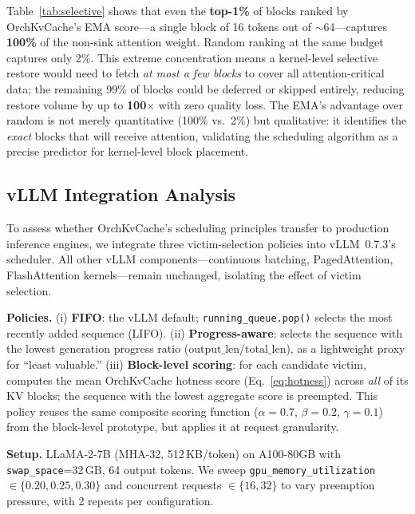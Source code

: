 \documentclass[conference]{IEEEtran}
\begin{document}
Table~\ref{tab:selective} shows that even the \textbf{top-1\%} of blocks ranked by OrchKvCache's EMA score---a single block of 16 tokens out of ${\sim}$64---captures \textbf{100\%} of the non-sink attention weight.  Random ranking at the same budget captures only 2\%.  This extreme concentration means a kernel-level selective restore would need to fetch \emph{at most a few blocks} to cover all attention-critical data; the remaining 99\% of blocks could be deferred or skipped entirely, reducing restore volume by up to \textbf{100$\times$} with zero quality loss.  The EMA's advantage over random is not merely quantitative (100\% vs.\ 2\%) but qualitative: it identifies the \emph{exact} blocks that will receive attention, validating the scheduling algorithm as a precise predictor for kernel-level block placement.

\subsection{vLLM Integration Analysis}
\label{sec:vllm-integration}

To assess whether OrchKvCache's scheduling principles transfer to production inference engines, we integrate three victim-selection policies into vLLM~0.7.3's scheduler. All other vLLM components---continuous batching, PagedAttention, FlashAttention kernels---remain unchanged, isolating the effect of victim selection.

\textbf{Policies.} (i) \textbf{FIFO}: the vLLM default; \texttt{running\_queue.pop()} selects the most recently added sequence (LIFO). (ii) \textbf{Progress-aware}: selects the sequence with the lowest generation progress ratio ($\text{output\_len} / \text{total\_len}$), as a lightweight proxy for ``least valuable.'' (iii) \textbf{Block-level scoring}: for each candidate victim, computes the mean OrchKvCache hotness score (Eq.~\ref{eq:hotness}) across \emph{all} of its KV blocks; the sequence with the lowest aggregate score is preempted. This policy reuses the same composite scoring function ($\alpha{=}0.7$, $\beta{=}0.2$, $\gamma{=}0.1$) from the block-level prototype, but applies it at request granularity.

\textbf{Setup.} LLaMA-2-7B (MHA-32, 512\,KB/token) on A100-80GB with \texttt{swap\_space}=32\,GB, 64 output tokens. We sweep \texttt{gpu\_memory\_utilization} $\in \{0.20, 0.25, 0.30\}$ and concurrent requests $\in \{16, 32\}$ to vary preemption pressure, with 2 repeats per configuration.
\end{document}
